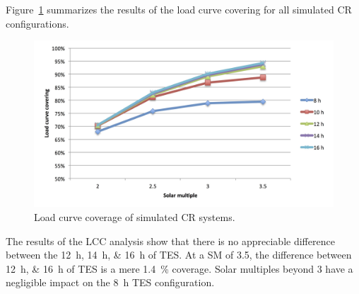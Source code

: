 
Figure~\ref{CR_LCCF} summarizes the results of the load curve covering for all simulated \ac{CR} configurations.


\begin{figure}[htbp]  
\centering
\includegraphics[width=1\linewidth]{FIG/CR_LCCF}
\caption[Load curve coverage of simulated CR systems.]{Load curve coverage of simulated CR systems.}\label{CR_LCCF}
\end{figure}

The results of the \ac{LCC} analysis show that there is no appreciable difference between the \SIlist{12;14;16}{h} of \ac{TES}. At a \ac{SM} of 3.5, the difference between \SIlist{12;16}{h} of \ac{TES} is a mere \SI{1.4}{\percent} coverage. Solar multiples beyond 3 have a negligible impact on the \SI{8}{h} \ac{TES} configuration.
\pagebreak
